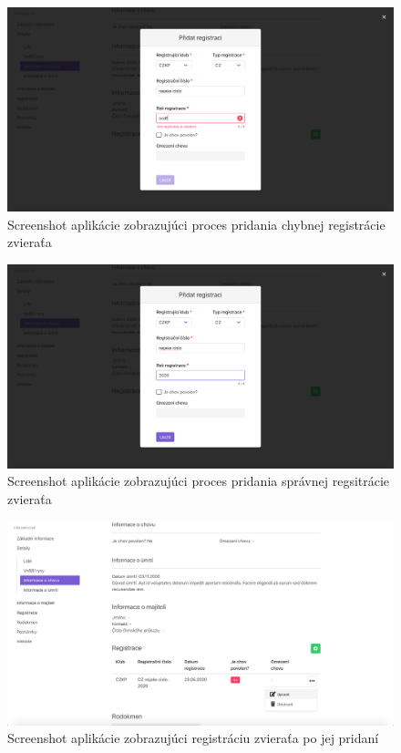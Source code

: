 \begin{figure}[H]
	\includegraphics[width=1.0\textwidth]{media/priloha/zviera/registracia/2.png}
	\caption{Screenshot aplikácie zobrazujúci proces pridania chybnej registrácie zvieraťa}
\end{figure}

\begin{figure}[H]
	\includegraphics[width=1.0\textwidth]{media/priloha/zviera/registracia/3.png}
	\caption{Screenshot aplikácie zobrazujúci proces pridania správnej regsitrácie zvieraťa}
\end{figure}

\begin{figure}[H]
	\includegraphics[width=1.0\textwidth]{media/priloha/zviera/registracia/4.png}
	\caption{Screenshot aplikácie zobrazujúci registráciu zvieraťa po jej pridaní}
\end{figure}


